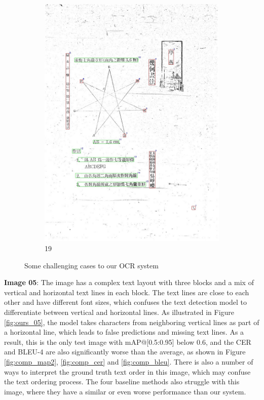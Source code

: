 \documentclass[12pt,twoside]{report}
\begin{document}
\begin{figure}[htbp]
\begin{subfigure}[b]{0.3\linewidth}
        \includegraphics[height=1.35\linewidth]{./figures/samples/19.jpg}
        \caption{19}
        \label{fig:ours_19}
    \end{subfigure}
    \caption{Some challenging cases to our OCR system}
    \label{fig:challenging_cases}
\end{figure}

\textbf{Image 05}: The image has a complex text layout with three blocks and a mix of vertical and horizontal text lines in each block. The text lines are close to each other and have different font sizes, which confuses the text detection model to differentiate between vertical and horizontal lines. As illustrated in Figure \ref{fig:ours_05}, the model takes characters from neighboring vertical lines as part of a horizontal line, which leads to false predictions and missing text lines. As a result, this is the only test image with mAP@[0.5:0.95] below 0.6, and the CER and BLEU-4 are also significantly worse than the average, as shown in Figure \ref{fig:comp_map2}, \ref{fig:comp_cer} and \ref{fig:comp_bleu}. There is also a number of ways to interpret the ground truth text order in this image, which may confuse the text ordering process. The four baseline methods also struggle with this image, where they have a similar or even worse performance than our system.
\end{document}
